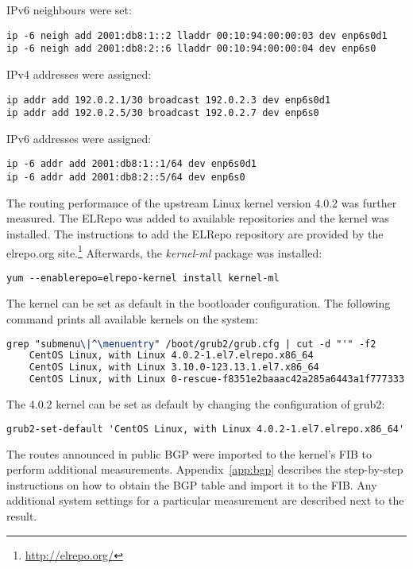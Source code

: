 \newpage
IPv6 neighbours were set:
\begin{lstlisting}
ip -6 neigh add 2001:db8:1::2 lladdr 00:10:94:00:00:03 dev enp6s0d1
ip -6 neigh add 2001:db8:2::6 lladdr 00:10:94:00:00:04 dev enp6s0
\end{lstlisting}
IPv4 addresses were assigned:
\begin{lstlisting}
ip addr add 192.0.2.1/30 broadcast 192.0.2.3 dev enp6s0d1
ip addr add 192.0.2.5/30 broadcast 192.0.2.7 dev enp6s0
\end{lstlisting}
IPv6 addresses were assigned:
\begin{lstlisting}
ip -6 addr add 2001:db8:1::1/64 dev enp6s0d1
ip -6 addr add 2001:db8:2::5/64 dev enp6s0
\end{lstlisting}

The routing performance of the upstream Linux kernel version 4.0.2 was further measured.
The ELRepo was added to available repositories and the kernel was installed.
The instructions to add the ELRepo repository are provided by the elrepo.org site.\footnote{\url{http://elrepo.org/}}
Afterwards, the {\it{kernel-ml}} package was installed:
\begin{lstlisting}
yum --enablerepo=elrepo-kernel install kernel-ml
\end{lstlisting}
The kernel can be set as default in the bootloader configuration.
The following command prints all available kernels on the system:
\begin{lstlisting}[language=TeX]
grep "submenu\|^\menuentry" /boot/grub2/grub.cfg | cut -d "'" -f2
	CentOS Linux, with Linux 4.0.2-1.el7.elrepo.x86_64
	CentOS Linux, with Linux 3.10.0-123.13.1.el7.x86_64
	CentOS Linux, with Linux 0-rescue-f8351e2baaac42a285a6443a1f777333
\end{lstlisting}
The 4.0.2 kernel can be set as default by changing the configuration of grub2:
\begin{lstlisting}[language=TeX]
grub2-set-default 'CentOS Linux, with Linux 4.0.2-1.el7.elrepo.x86_64'
\end{lstlisting}

The routes announced in public BGP were imported to the kernel's FIB to perform additional measurements.
Appendix~\ref{app:bgp} describes the step-by-step instructions on how to obtain the BGP table and import it to the FIB.
Any additional system settings for a particular measurement are described next to the result.
